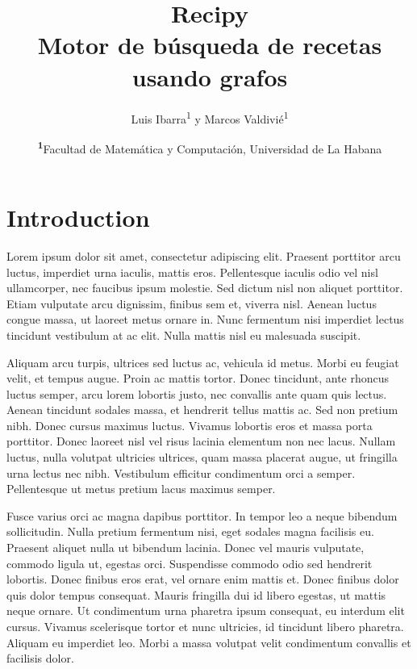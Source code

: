 \documentclass[
	a4paper, %
	10pt, %
	unnumberedsections, %
	twoside, %
]{LTJournalArticle}
\title{Recipy\\Motor de búsqueda de recetas usando grafos} %
\author{%
	Luis Ibarra\textsuperscript{1} y Marcos Valdivié\textsuperscript{1} 
}
\date{\footnotesize\textsuperscript{\textbf{1}}Facultad de Matemática y Computación, Universidad de La Habana}
\begin{document}
\maketitle %


\section{Introduction}

Lorem ipsum dolor sit amet, consectetur adipiscing elit. Praesent porttitor arcu luctus, imperdiet urna iaculis, mattis eros. Pellentesque iaculis odio vel nisl ullamcorper, nec faucibus ipsum molestie. Sed dictum nisl non aliquet porttitor. Etiam vulputate arcu dignissim, finibus sem et, viverra nisl. Aenean luctus congue massa, ut laoreet metus ornare in. Nunc fermentum nisi imperdiet lectus tincidunt vestibulum at ac elit. Nulla mattis nisl eu malesuada suscipit.

Aliquam arcu turpis, ultrices sed luctus ac, vehicula id metus. Morbi eu feugiat velit, et tempus augue. Proin ac mattis tortor. Donec tincidunt, ante rhoncus luctus semper, arcu lorem lobortis justo, nec convallis ante quam quis lectus. Aenean tincidunt sodales massa, et hendrerit tellus mattis ac. Sed non pretium nibh. Donec cursus maximus luctus. Vivamus lobortis eros et massa porta porttitor. Donec laoreet nisl vel risus lacinia elementum non nec lacus. Nullam luctus, nulla volutpat ultricies ultrices, quam massa placerat augue, ut fringilla urna lectus nec nibh. Vestibulum efficitur condimentum orci a semper. Pellentesque ut metus pretium lacus maximus semper.

Fusce varius orci ac magna dapibus porttitor. In tempor leo a neque bibendum sollicitudin. Nulla pretium fermentum nisi, eget sodales magna facilisis eu. Praesent aliquet nulla ut bibendum lacinia. Donec vel mauris vulputate, commodo ligula ut, egestas orci. Suspendisse commodo odio sed hendrerit lobortis. Donec finibus eros erat, vel ornare enim mattis et. Donec finibus dolor quis dolor tempus consequat. Mauris fringilla dui id libero egestas, ut mattis neque ornare. Ut condimentum urna pharetra ipsum consequat, eu interdum elit cursus. Vivamus scelerisque tortor et nunc ultricies, id tincidunt libero pharetra. Aliquam eu imperdiet leo. Morbi a massa volutpat velit condimentum convallis et facilisis dolor.
\end{document}
